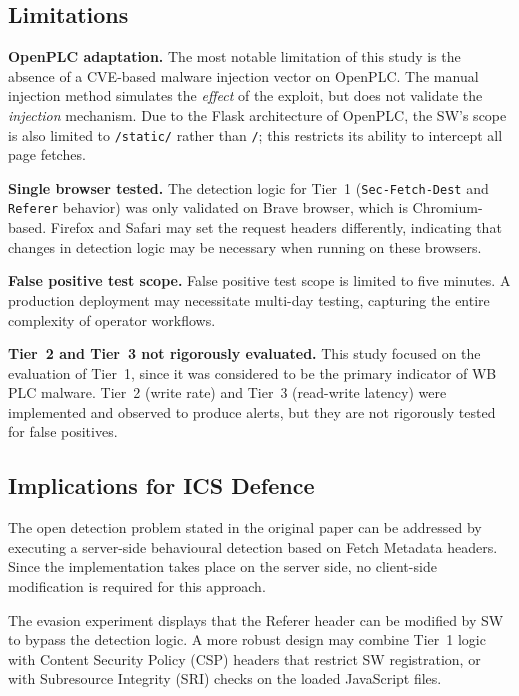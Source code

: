 \documentclass[conference]{IEEEtran}
\begin{document}
\subsection{Limitations}

\textbf{OpenPLC adaptation.}
The most notable limitation of this study is the absence of a CVE-based malware injection vector on OpenPLC. The manual injection method simulates the \emph{effect} of the exploit, but does not validate the \emph{injection} mechanism. Due to the Flask architecture of OpenPLC, the SW's scope is also limited to  \texttt{/static/} rather than \texttt{/}; this restricts its ability to intercept all page fetches.

\textbf{Single browser tested.}
The detection logic for Tier~1 (\texttt{Sec-Fetch-Dest} and
\texttt{Referer} behavior) was only validated on Brave browser, which is Chromium-based. Firefox and Safari may set the request headers differently, indicating that changes in detection logic may be necessary when running on these browsers.

\textbf{False positive test scope.}
False positive test scope is limited to five minutes. A production deployment may necessitate multi-day testing, capturing the entire complexity of operator workflows.

\textbf{Tier~2 and Tier~3 not rigorously evaluated.}
This study focused on the evaluation of Tier~1, since it was considered to be the primary indicator of WB PLC malware. Tier~2 (write rate) and Tier~3 (read-write latency) were implemented and observed to produce alerts, but they are not rigorously tested for false positives.

\subsection{Implications for ICS Defence}

The open detection problem stated in the original paper can be addressed by executing a server-side behavioural detection based on Fetch Metadata headers. Since the implementation takes place on the server side, no client-side modification is required for this approach.

The evasion experiment displays that the Referer header can be modified by SW to bypass the detection logic. A more robust design may combine Tier~1 logic with Content Security Policy (CSP) headers that restrict SW registration, or with Subresource Integrity (SRI) checks on the loaded JavaScript files.

\end{document}
